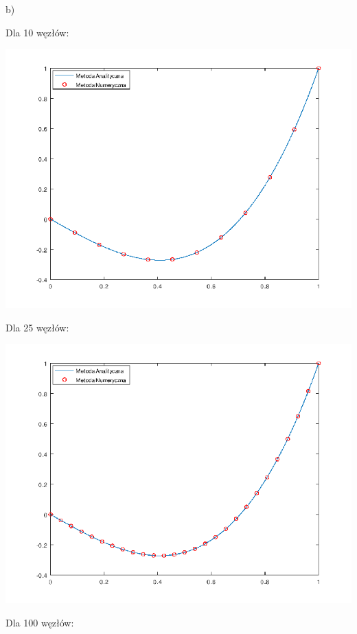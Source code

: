\newpage

b)

Dla 10 węzłów:

{\centering

\includegraphics{Lab3/charts/zad2/lab_3_2_n_10.png}

}

Dla 25 węzłów:

{\centering

\includegraphics{Lab3/charts/zad2/lab_3_2_n_25.png}

}

\newpage

Dla 100 węzłów:

